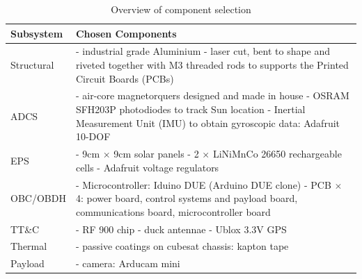 \begin{table}[H]
   \centering
   \caption{Overview of component selection}
   \vspace{0.2cm}
   \label{tab:components}
   {\renewcommand{\arraystretch}{1.4}%
   \begin{tabular}{|>{\arraybackslash}m{3cm}|>{\arraybackslash}m{12cm}|}
         \hline
         \textbf{Subsystem} & \textbf{Chosen Components} \\ \hline\hline
         Structural & 	 - industrial grade Aluminium\newline
                         - laser cut, bent to shape and riveted together with M3 threaded rods to supports the Printed Circuit Boards (PCBs)\\\hline
         ADCS & 		 - air-core magnetorquers designed and made in house\newline
                         - OSRAM SFH203P photodiodes to track Sun location\newline
                         - Inertial Measurement Unit (IMU) to obtain gyroscopic data: Adafruit 10-DOF\\\hline
         EPS & - 9cm $\times$ 9cm solar 			panels\newline
                         - 2 $\times$ LiNiMnCo 26650 rechargeable cells\newline
                         - Adafruit voltage regulators\\\hline
         OBC/OBDH & - Microcontroller: Iduino DUE (Arduino DUE clone)\newline
                         - PCB $\times$ 4: power board, control systems and payload board, communications board, microcontroller board\\\hline
         TT\&C &
                         - RF 900 chip\newline
                         - duck antennae\newline
                         - Ublox 3.3V GPS\\\hline
         Thermal & 		 - passive coatings on cubesat chassis: kapton tape\\\hline
         Payload & 		 - camera: Arducam mini\\\hline  
   \end{tabular} } 
\end{table}

